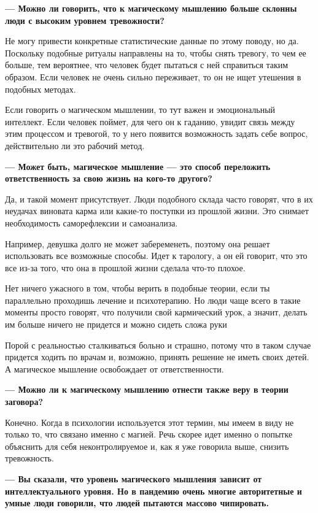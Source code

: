 \textbf{--- Можно ли говорить, что к магическому мышлению больше склонны люди с высоким уровнем тревожности?}

Не могу привести конкретные статистические данные по этому поводу, но  да. Поскольку подобные ритуалы направлены на то, чтобы снять тревогу, то чем ее больше, тем вероятнее, что человек будет пытаться с ней справиться таким образом. Если человек не очень сильно переживает, то он не ищет утешения в подобных методах.

Если говорить о магическом мышлении, то тут важен и эмоциональный интеллект. Если человек поймет, для чего он  к гаданию, увидит связь между этим процессом и тревогой, то у него появится возможность задать себе вопрос, действительно ли это рабочий метод.

\textbf{--- Может быть, магическое мышление — это способ переложить ответственность за свою жизнь на кого-то другого?}

Да, и такой момент присутствует. Люди подобного склада часто говорят, что в их неудачах виновата карма или какие-то поступки из прошлой жизни. Это снимает необходимость саморефлексии и самоанализа.

Например, девушка долго не может забеременеть, поэтому она решает использовать все возможные способы. Идет к тарологу, а он ей говорит, что это все из-за того, что она в прошлой жизни сделала что-то плохое.

\begin{fancyquotes}
    Нет ничего ужасного в том, чтобы верить в подобные теории, если ты параллельно проходишь лечение и психотерапию. Но люди чаще всего в такие моменты просто говорят, что получили свой кармический урок, а значит, делать им больше ничего не придется и можно сидеть сложа руки
\end{fancyquotes}

Порой с реальностью сталкиваться больно и страшно, потому что в таком случае придется ходить по врачам и, возможно, принять решение не иметь своих детей. А магическое мышление освобождает от ответственности.

\textbf{--- Можно ли к магическому мышлению отнести также веру в теории заговора?}

Конечно. Когда в психологии используется этот термин, мы имеем в виду не только то, что связано именно с магией. Речь скорее идет именно о попытке объяснить для себя неконтролируемое и, как я уже говорила выше, снизить тревожность.

\textbf{--- Вы сказали, что уровень магического мышления зависит от интеллектуального уровня. Но в пандемию очень многие авторитетные и умные люди говорили, что людей пытаются массово чипировать.}

